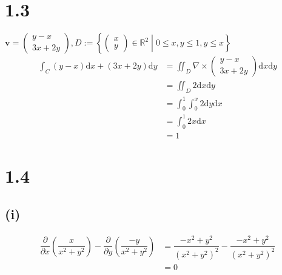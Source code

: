 \documentclass[11pt]{article}
\newcommand{\ds}{\displaystyle}
\begin{document}
	\section*{1.3}
	$\mathbf{v}=\left(\begin{array}{cc}
		y-x\\3x+2y
	\end{array}\right),D:=\left\{\left(\begin{array}{cc}
	    x\\y
	\end{array}\right)\in\mathbb{R}^{2}\middle|0\leq x,y\leq1,y\leq x\right\}$
	\begin{align*}
		\ds\int_{C}\left(y-x\right)\mathrm{d}x+\left(3x+2y\right)\mathrm{d}y&=\ds\iint_{D}\nabla\times\left(\begin{array}{cc}
			y-x\\3x+2y
		\end{array}\right)\mathrm{d}x\mathrm{d}y\\
		&=\ds\iint_{D}2\mathrm{d}x\mathrm{d}y\\
		&=\ds\int_{0}^{1}\ds\int_{0}^{x}2\mathrm{d}y\mathrm{d}x\\
		&=\ds\int_{0}^{1}2x\mathrm{d}x\\
		&=1
	\end{align*}
	
	\section*{1.4}
	\subsection*{(i)}
	\begin{align*}
		\dfrac{\partial}{\partial x}\left(\dfrac{x}{x^{2}+y^{2}}\right)-\dfrac{\partial}{\partial y}\left(\dfrac{-y}{x^{2}+y^{2}}\right)
		&=\dfrac{-x^{2}+y^{2}}{\left(x^{2}+y^{2}\right)^{2}}-\dfrac{-x^{2}+y^{2}}{\left(x^{2}+y^{2}\right)^{2}}\\
		&=0
	\end{align*}
	
\end{document}
